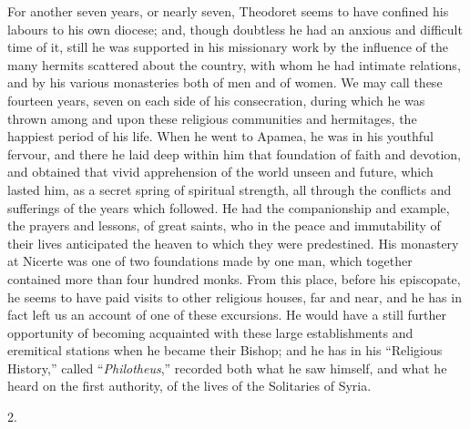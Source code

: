 For another seven years, or nearly seven, Theodoret seems to have
confined his labours to his own diocese; and, though doubtless he had
an anxious and difficult time of it, still he was supported in his
missionary work by the influence of the many hermits scattered about
the country, with whom he had intimate relations, and by his various
monasteries both of men and of women. We may call these fourteen
years, seven on each side of his consecration, during which he was
thrown among and upon these religious communities and hermitages, the
happiest period of his life. When he went to Apamea, he was in his
youthful fervour, and there he laid deep within him that foundation of
faith and devotion, and obtained that vivid apprehension of the world
unseen and future, which lasted him, as a secret spring of spiritual
strength, all through the conflicts and sufferings of the years which
followed. He had the companionship and example, the prayers and
lessons, of great saints, who in the peace and immutability of their
lives anticipated the heaven to which they were predestined. His
monastery at Nicerte was one of two foundations made by one man, which
together contained more than four hundred monks. From this place,
before his episcopate, he seems to have paid visits to other religious
houses, far and near, and he has in fact left us an account of one of
these excursions. He would have a still further opportunity of
becoming acquainted with these large establishments and eremitical
stations when he became their Bishop; and he has in his
``Religious History,'' called ``\emph{Philotheus},''
recorded both what he saw himself, and what he heard on the first
authority, of the lives of the Solitaries of Syria.

2.

